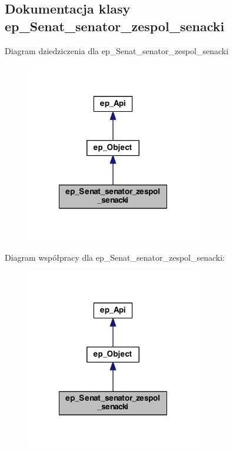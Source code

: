 \hypertarget{classep___senat__senator__zespol__senacki}{\subsection{Dokumentacja klasy ep\-\_\-\-Senat\-\_\-senator\-\_\-zespol\-\_\-senacki}
\label{classep___senat__senator__zespol__senacki}
}


Diagram dziedziczenia dla ep\-\_\-\-Senat\-\_\-senator\-\_\-zespol\-\_\-senacki\nopagebreak
\begin{figure}[H]
\begin{center}
\leavevmode
\includegraphics[width=216pt]{classep___senat__senator__zespol__senacki__inherit__graph}
\end{center}
\end{figure}


Diagram współpracy dla ep\-\_\-\-Senat\-\_\-senator\-\_\-zespol\-\_\-senacki\-:\nopagebreak
\begin{figure}[H]
\begin{center}
\leavevmode
\includegraphics[width=216pt]{classep___senat__senator__zespol__senacki__coll__graph}
\end{center}
\end{figure}
